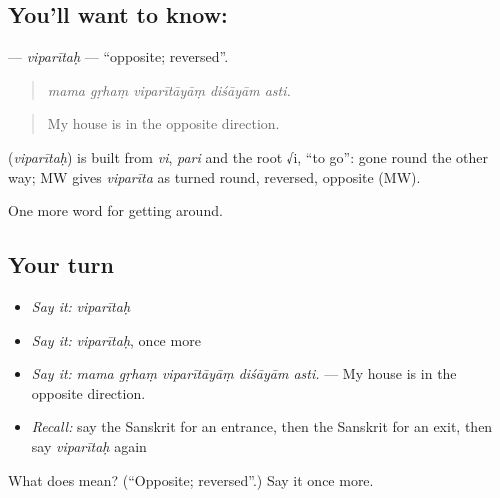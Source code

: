 \subsection*{You'll want to know: }
\textbf{} — \emph{viparītaḥ} — \textquotedblleft{}opposite; reversed\textquotedblright{}.

\begin{quote}
    
\end{quote}

\begin{quote}
\emph{mama gṛhaṃ viparītāyāṃ diśāyām asti.}
\end{quote}

\begin{quote}
My house is in the opposite direction.
\end{quote}

\begin{cousinweb}
\textbf{} (\emph{viparītaḥ}) is built from \emph{vi}, \emph{pari} and the root √i, \textquotedblleft{}to go\textquotedblright{}: gone round the other way; MW gives \emph{viparīta} as turned round, reversed, opposite (MW).
\end{cousinweb}

\begin{grammarlens}[title={What you've built}]
One more word for getting around.
\end{grammarlens}

\subsection*{Your turn}
\begin{itemize}
\raggedright
  \item \emph{Say it:} \emph{viparītaḥ}
  \item \emph{Say it:} \emph{viparītaḥ}, once more
  \item \emph{Say it:} \emph{mama gṛhaṃ viparītāyāṃ diśāyām asti.} — My house is in the opposite direction.
  \item \emph{Recall:} say the Sanskrit for an entrance, then the Sanskrit for an exit, then say \emph{viparītaḥ} again
\end{itemize}

\begin{tcolorbox}[breakable,colback=teal!4,colframe=teal!35!black,title={Before you move on}]
What does  mean? (\textquotedblleft{}Opposite; reversed\textquotedblright{}.) Say it once more.
\end{tcolorbox}
